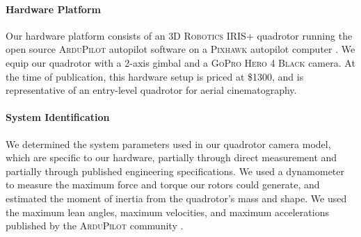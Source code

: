 \paragraph{Hardware Platform}
Our hardware platform consists of an \textsc{3D Robotics IRIS+} quadrotor \cite{3dr_iris_p:2014} running the open source \textsc{ArduPilot} autopilot software \cite{apm:2015} on a \textsc{Pixhawk} autopilot computer \cite{meier:2012}.
We equip our quadrotor with a 2-axis gimbal and a \textsc{GoPro Hero 4 Black} camera.
At the time of publication, this hardware setup is priced at \$1300, and is representative of an entry-level quadrotor for aerial cinematography.  

\paragraph{System Identification}
We determined the system parameters used in our quadrotor camera model, which are specific to our hardware, partially through direct measurement and partially through published engineering specifications.
We used a dynamometer to measure the maximum force and torque our rotors could generate, and estimated the moment of inertia from the quadrotor's mass and shape.
We used the maximum lean angles, maximum velocities, and maximum accelerations published by the \textsc{ArduPilot} community \cite{apm:2015}. 



